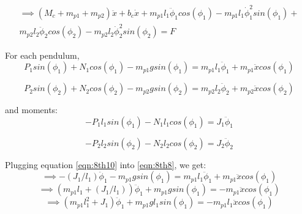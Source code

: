 \documentclass{article}
\begin{document}
\begin{equation}
\begin{split}
\implies (M_c + m_{p1} + m_{p2}) \ddot{x} + b_c \dot{x} + m_{p1} l_1 \ddot{\phi}_1 cos(\phi_1) - m_{p1} l_1 \dot{\phi}_1^2 sin(\phi_1) + \\
m_{p2} l_2 \ddot{\phi}_2 cos(\phi_2) - m_{p2} l_2 \dot{\phi}_2^2 sin(\phi_2) = F
\end{split}
\label{eqn:8th7}
\end{equation}

For each pendulum,
\begin{equation}
P_1 sin(\phi_1) + N_1 cos(\phi_1) - m_{p1} g sin(\phi_1) = m_{p1} l_1 \ddot{\phi}_1 + m_{p1} \ddot{x} cos(\phi_1)
\label{eqn:8th8}
\end{equation}

\begin{equation}
P_2 sin(\phi_2) + N_2 cos(\phi_2) - m_{p2} g sin(\phi_2) = m_{p2} l_2 \ddot{\phi}_2 + m_{p2} \ddot{x} cos(\phi_2)
\label{eqn:8th9}
\end{equation}

and moments:
\begin{equation}
-P_1 l_1 sin(\phi_1) - N_1 l_1 cos(\phi_1) = J_1 \ddot{\phi}_1
\label{eqn:8th10}
\end{equation}

\begin{equation}
-P_2 l_2 sin(\phi_2) - N_2 l_2 cos(\phi_2) = J_2 \ddot{\phi}_2
\label{eqn:8th11}
\end{equation}

Plugging equation \ref{eqn:8th10} into \ref{eqn:8th8}, we get:
\begin{equation*}
\implies - (J_1 / l_1) \ddot{\phi}_1 - m_{p1} g sin(\phi_1) = m_{p1} l_1 \ddot{\phi}_1 + m_{p1} \ddot{x} cos(\phi_1)
\end{equation*}
\begin{equation*}
\implies (m_{p1} l_1 + (J_1 / l_1)) \ddot{\phi}_1 + m_{p1} g sin(\phi_1) = -m_{p1} \ddot{x} cos(\phi_1)
\end{equation*}
\begin{equation}
\implies (m_{p1} l_1^2 + J_1) \ddot{\phi}_1 + m_{p1} g l_1 sin(\phi_1) = -m_{p1} l_1 \ddot{x} cos(\phi_1)
\label{eqn:8th12}
\end{equation}
\end{document}
